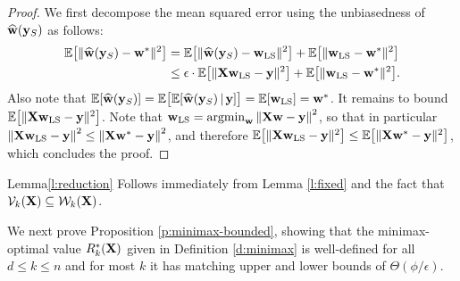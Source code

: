 \documentclass[12pt]{sty/colt2019/colt2018-arxiv}
\begin{document}
\begin{proof}
We first decompose the mean squared error using the unbiasedness of
$\widehat{\mathbf w}(\mathbf y_S)$ as follows:  
\begin{align*}
  \mathbb E\big[\|\widehat{\mathbf w}(\mathbf y_S)-\mathbf w^*\|^2\big]
  &=\mathbb E\big[\|\widehat{\mathbf w}(\mathbf y_S)-\mathbf w_{\mathrm{LS}}\|^2\big] +
    \mathbb E\big[\|\mathbf w_{\mathrm{LS}}-\mathbf w^*\|^2\big]\\
  &\leq \epsilon\cdot \mathbb E\big[\|\mathbf X\mathbf w_{\mathrm{LS}}-\mathbf y\|^2\big] + \mathbb E\big[\|\mathbf w_{\mathrm{LS}}-\mathbf w^*\|^2\big].
\end{align*}
Also note that $\mathbb E[\widehat{\mathbf w}(\mathbf y_S)] = \mathbb E\big[\mathbb E[\widehat{\mathbf w}(\mathbf y_S)\,|\,\mathbf y]\big]=\mathbb E[\mathbf w_{\mathrm{LS}}]=\mathbf w^*$.
It remains to bound $\mathbb E\big[\|\mathbf X\mathbf w_{\mathrm{LS}}-\mathbf y\|^2\big]$.
Note that $\mathbf w_{\mathrm{LS}} = \operatorname*{\mathop{\mathrm{argmin}}}_\mathbf w {\| \mathbf X\mathbf w - \mathbf y \|}^2$,
so that in particular ${\| \mathbf X\mathbf w_{\mathrm{LS}} - \mathbf y \|}^2 \le {\| \mathbf X\mathbf w^* - \mathbf y\|}^2$,
and therefore $\mathbb E\big[\|\mathbf X\mathbf w_{\mathrm{LS}}-\mathbf y\|^2\big] \le \mathbb E\big[\|\mathbf X\mathbf w^*-\mathbf y\|^2\big]$,
which concludes the proof.
\end{proof}
\begin{proofof}{Lemma}{\ref{l:reduction}}
Follows immediately from Lemma \ref{l:fixed} and the fact that $\mathcal{V}_k(\mathbf X)\subseteq\mathcal{W}_k(\mathbf X)$.
\end{proofof}
We next prove Proposition \ref{p:minimax-bounded}, showing that
the minimax-optimal value $R_k^*(\mathbf X)$ given in Definition
\ref{d:minimax} is well-defined for all $d\leq k\leq n$ and
for most $k$ it has matching upper and lower bounds of $\Theta(\phi/\epsilon)$.
\end{document}
